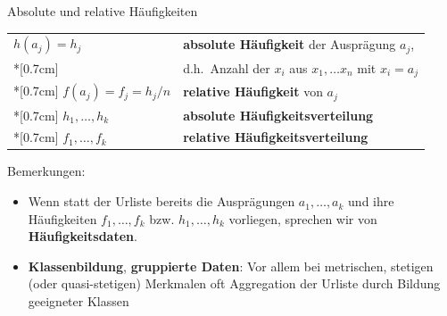 \documentclass[
  10pt,
  ignorenonframetext,
]{beamer}
\providecommand{\tightlist}{%
  \setlength{\itemsep}{0pt}\setlength{\parskip}{0pt}}
\begin{document}
\begin{frame}{Absolute und relative Häufigkeiten}
\protect\hypertarget{absolute-und-relative-huxe4ufigkeiten}{}
\begin{tabular}{ll}
$h(a_j) = h_j$ & \textbf{absolute Häufigkeit} der
Ausprägung $a_j$,\\*[0.7cm]
           &  d.h.~Anzahl der $x_i$ aus $x_1,\dots x_n$ mit $x_i = a_j$
\\*[0.7cm]
$ f(a_j) = f_j = h_j/n$ & \textbf{relative Häufigkeit}
von $a_j$ \\*[0.7cm]
$h_1 , \ldots , h_k$    & \textbf{absolute
Häufigkeitsverteilung} \\*[0.7cm]
$f_1 , \ldots , f_k $   & \textbf{relative
Häufigkeitsverteilung}
\end{tabular}
\end{frame}

\begin{frame}{Bemerkungen:}
\protect\hypertarget{bemerkungen}{}
\begin{itemize}
\tightlist
\item
  Wenn statt der Urliste bereits die Ausprägungen \(a_1,\ldots,a_k\) und
  ihre Häufigkeiten \(f_1,\ldots,f_k\) bzw. \(h_1,\ldots,h_k\)
  vorliegen, sprechen wir von \textbf{Häufigkeitsdaten}.
\item
  \textbf{Klassenbildung}, \textbf{gruppierte Daten}: Vor allem bei
  metrischen, stetigen (oder quasi-stetigen) Merkmalen oft Aggregation
  der Urliste durch Bildung geeigneter Klassen
\end{itemize}
\end{frame}
\end{document}
